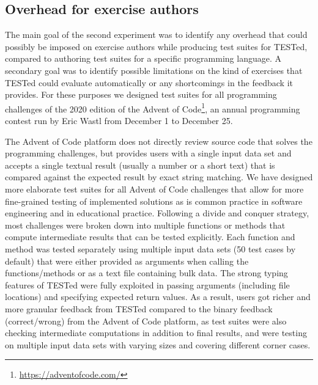 \documentclass[../main]{subfiles}
\begin{document}
\subsection{Overhead for exercise authors}\label{subsec:overhead-for-exercise-designers}

The main goal of the second experiment was to identify any overhead that could possibly be imposed on exercise authors while producing test suites for TESTed, compared to authoring test suites for a specific programming language.
A secondary goal was to identify possible limitations on the kind of exercises that TESTed could evaluate automatically or any shortcomings in the feedback it provides.
For these purposes we designed test suites for all programming challenges of the 2020 edition of the Advent of Code\footnote{\url{https://adventofcode.com/}}, an annual programming contest run by Eric Wastl from December 1 to December 25.

The Advent of Code platform does not directly review source code that solves the programming challenges, but provides users with a single input data set and accepts a single textual result (usually a number or a short text) that is compared against the expected result by exact string matching.
We have designed more elaborate test suites for all Advent of Code challenges that allow for more fine-grained testing of implemented solutions as is common practice in software engineering and in educational practice.
Following a divide and conquer strategy, most challenges were broken down into multiple functions or methods that compute intermediate results that can be tested explicitly.
Each function and method was tested separately using multiple input data sets (50 test cases by default) that were either provided as arguments when calling the functions/methods or as a text file containing bulk data.
The strong typing features of TESTed were fully exploited in passing arguments (including file locations) and specifying expected return values.
As a result, users got richer and more granular feedback from TESTed compared to the binary feedback (correct/wrong) from the Advent of Code platform, as test suites were also checking intermediate computations in addition to final results, and were testing on multiple input data sets with varying sizes and covering different corner cases.
\end{document}
